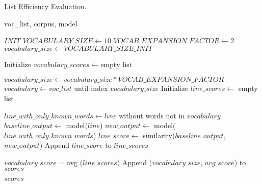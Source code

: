 \begin{algorithm}
\caption{List Efficiency Evaluation.}
\label{alg:efficiency-evaluation}
\begin{algorithmic}[1]
\Require voc\_list, corpus, model

\State $INIT\_VOCABULARY\_SIZE \gets 10$ 
\State $VOCAB\_EXPANSION\_FACTOR \gets 2$ 
\State $vocabulary\_size \gets VOCABULARY\_SIZE\_INIT$ 

\State Initialize $vocabulary\_scores \gets \text{empty list}$

    \State $vocabulary\_size \gets vocabulary\_size * VOCAB\_EXPANSION\_FACTOR$ 
    \State $vocabulary \gets voc\_list$ until index $vocabulary\_size$
    \State Initialize $line\_scores \gets$ empty list
    
        \State $line\_with\_only\_known\_words \gets line $ without words not in $vocabulary$
        \State $baseline\_output \gets$ model($line$)
        \State $new\_output \gets$ model($line\_with\_only\_known\_words$)
        \State $line\_score \gets$ similarity($baseline\_output $, $new\_output$)
        \State Append $line\_score$ to $line\_scores$
    \EndFor

    \State $vocabulary\_score$ = avg ($line\_scores$)
    \State Append ($vocabulary\_size$, $avg\_score$) to $scores$
\EndWhile

\State \Return $scores$

\end{algorithmic}
\end{algorithm}
